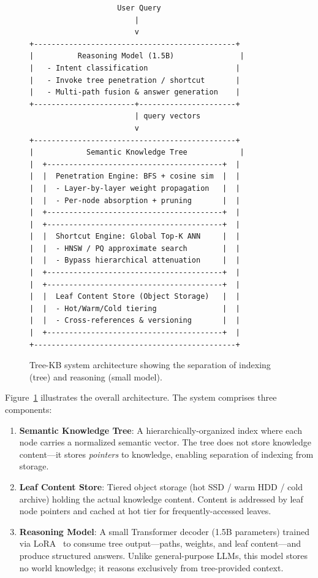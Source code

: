 \documentclass[11pt,a4paper]{article}
\begin{document}
\begin{figure}[H]
\centering
\begin{minipage}{0.9\textwidth}
\small
\begin{verbatim}
                    User Query
                        |
                        v
+----------------------------------------------+
|          Reasoning Model (1.5B)               |
|   - Intent classification                    |
|   - Invoke tree penetration / shortcut       |
|   - Multi-path fusion & answer generation    |
+-----------------------+----------------------+
                        | query vectors
                        v
+----------------------------------------------+
|            Semantic Knowledge Tree            |
|  +----------------------------------------+  |
|  |  Penetration Engine: BFS + cosine sim  |  |
|  |  - Layer-by-layer weight propagation   |  |
|  |  - Per-node absorption + pruning       |  |
|  +----------------------------------------+  |
|  +----------------------------------------+  |
|  |  Shortcut Engine: Global Top-K ANN     |  |
|  |  - HNSW / PQ approximate search        |  |
|  |  - Bypass hierarchical attenuation     |  |
|  +----------------------------------------+  |
|  +----------------------------------------+  |
|  |  Leaf Content Store (Object Storage)   |  |
|  |  - Hot/Warm/Cold tiering               |  |
|  |  - Cross-references & versioning       |  |
|  +----------------------------------------+  |
+----------------------------------------------+
\end{verbatim}
\end{minipage}
\caption{Tree-KB system architecture showing the separation of indexing (tree) and reasoning (small model).}
\label{fig:architecture}
\end{figure}

Figure~\ref{fig:architecture} illustrates the overall architecture. The system comprises three components:

\begin{enumerate}
    \item \textbf{Semantic Knowledge Tree}: A hierarchically-organized index where each node carries a normalized semantic vector. The tree does not store knowledge content---it stores \textit{pointers} to knowledge, enabling separation of indexing from storage.
    \item \textbf{Leaf Content Store}: Tiered object storage (hot SSD / warm HDD / cold archive) holding the actual knowledge content. Content is addressed by leaf node pointers and cached at hot tier for frequently-accessed leaves.
    \item \textbf{Reasoning Model}: A small Transformer decoder (1.5B parameters) trained via LoRA~\cite{hu2021lora} to consume tree output---paths, weights, and leaf content---and produce structured answers. Unlike general-purpose LLMs, this model stores no world knowledge; it reasons exclusively from tree-provided context.
\end{enumerate}
\end{document}
